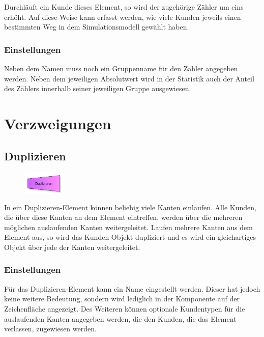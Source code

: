 Durchläuft ein Kunde dieses Element, so wird der zugehörige Zähler um eins erhöht. Auf diese Weise kann erfasst werden,
wie viele Kunden jeweils einen bestimmten Weg in dem Simulationsmodell gewählt haben.

\subsection*{Einstellungen}

Neben dem Namen muss noch ein Gruppenname für den Zähler angegeben werden. Neben dem jeweiligen
Absolutwert wird in der Statistik auch der Anteil des Zählers innerhalb seiner jeweiligen Gruppe ausgewiesen.





\chapter{Verzweigungen}

\section{Duplizieren}
\label{ref:ModelElementDuplicate}

\begin{figure}
\vspace{-22pt}
\includegraphics[width=2cm]{imageModelElementDuplicate.png}
\vspace{-22pt}
\end{figure}

In ein Duplizieren-Element können beliebig viele Kanten einlaufen. Alle Kunden, die über diese Kanten an dem Element eintreffen,
werden über die mehreren möglichen auslaufenden Kanten weitergeleitet. Laufen mehrere Kanten aus dem Element aus, so wird das
Kunden-Objekt dupliziert und es wird ein gleichartiges Objekt über jede der Kanten weitergeleitet.

\subsection*{Einstellungen}

Für das Duplizieren-Element kann ein Name eingestellt werden. Dieser hat jedoch keine weitere Bedeutung, sondern wird lediglich
in der Komponente auf der Zeichenfläche angezeigt. Des Weiteren können optionale Kundentypen für die auslaufenden Kanten angegeben
werden, die den Kunden, die das Element verlassen, zugewiesen werden.


